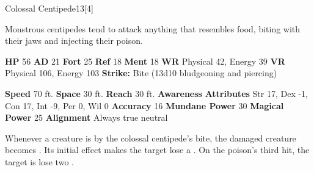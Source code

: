   
  \begin{monsection}{Colossal Centipede}{13}[4]
    \vspace{-1em}\vspace{-1em}
    \vspace{0em}

    
    Monstrous centipedes tend to attack anything that resembles food, biting with their jaws and injecting their poison.
  
    

    \begin{spellcontent}
      \begin{spelltargetinginfo}
        \pari \textbf{HP} 56 \monsep
          \textbf{AD} 21 \monsep
          \textbf{Fort} 25 \monsep
          \textbf{Ref} 18 \monsep
          \textbf{Ment} 18
        \pari \textbf{WR} Physical 42, Energy 39 \monsep
        \textbf{VR} Physical 106, Energy 103
        \pari \textbf{Strike:}
            Bite  (13d10 bludgeoning and piercing)
      \end{spelltargetinginfo}
    \end{spellcontent}
    \begin{monsterfooter}
      \pari \textbf{Speed} 70 ft. \monsep
        \textbf{Space} 30 ft. \monsep
        \textbf{Reach} 30 ft.
      \pari \textbf{Awareness} 
      \pari \textbf{Attributes}
        Str 17, Dex -1,
        Con 17, Int -9,
        Per 0, Wil 0
      \pari \textbf{Accuracy} 16 \monsep
        \textbf{Mundane Power} 30 \monsep
      \textbf{Magical Power} 25
      \pari \textbf{Alignment} Always true neutral
    \end{monsterfooter}
  \end{monsection}
    Whenever a creature is  by the colossal centipede's bite,
      the damaged creature becomes .
    Its initial effect makes the target lose a .
    On the poison's third hit, the target is lose two .
  

